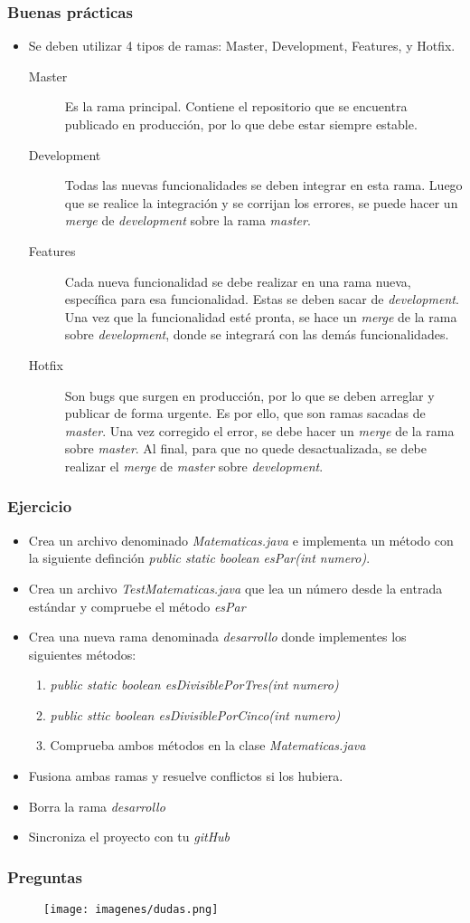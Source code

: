 \documentclass{beamer}
\begin{document}
\begin{frame}
\frametitle{Buenas prácticas}
\begin{footnotesize}
\begin{itemize}[<+->]
\item Se deben utilizar 4 tipos de ramas: Master, Development, Features, y Hotfix.
\begin{description}
\item[Master] Es la rama principal. Contiene el repositorio que se encuentra publicado en producción, por lo que debe estar siempre estable.
\item[Development] Todas las nuevas funcionalidades se deben integrar en esta rama. Luego que se realice la integración y se corrijan los errores, se puede hacer un \emph{merge} de \emph{development} sobre la rama \emph{master}.
\item[Features] Cada nueva funcionalidad se debe realizar en una rama nueva, específica para esa funcionalidad. Estas se deben sacar de \emph{development}. Una vez que la funcionalidad esté pronta, se hace un \emph{merge} de la rama sobre \emph{development}, donde se integrará con las demás funcionalidades.
\item[Hotfix] Son bugs que surgen en producción, por lo que se deben arreglar y publicar de forma urgente. Es por ello, que son ramas sacadas de \emph{master}. Una vez corregido el error, se debe hacer un \emph{merge} de la rama sobre \emph{master}. Al final, para que no quede desactualizada, se debe realizar el \emph{merge} de \emph{master} sobre \emph{development}.
\end{description}
\end{itemize}
\end{footnotesize}
\end{frame}

\begin{frame}[fragile]
\frametitle{Ejercicio}
\begin{itemize}[<+->]
\item Crea un archivo denominado \emph{Matematicas.java} e implementa un método con la siguiente definción \emph{public static boolean esPar(int numero)}.
\item Crea un archivo \emph{TestMatematicas.java} que lea un número desde la entrada estándar y compruebe el método \emph{esPar}
\item Crea una nueva rama denominada \emph{desarrollo} donde implementes los siguientes métodos:
\begin{enumerate}
\item \emph{public static boolean esDivisiblePorTres(int numero)}
\item \emph{public sttic boolean esDivisiblePorCinco(int numero)}
\item Comprueba ambos métodos en la clase \emph{Matematicas.java}
\end{enumerate}
\item Fusiona ambas ramas y resuelve conflictos si los hubiera.
\item Borra la rama \emph{desarrollo}
\item Sincroniza el proyecto con tu \emph{gitHub}
\end{itemize}
\end{frame}


\begin{frame}
\frametitle{Preguntas} 
\begin{figure}
\texttt{[image: imagenes/dudas.png]} 
\end{figure} 
\end{frame}
\end{document}
